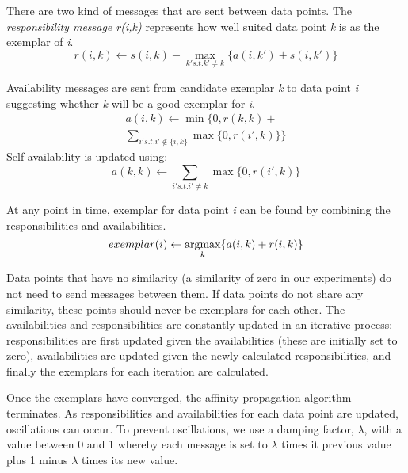 There are two kind of messages that are sent between data points. The \emph{responsibility message r(i,k)} represents how well suited data point \emph{k} is as the exemplar of \emph{i}.
\begin{equation}
	\displaystyle r(i,k)\leftarrow s(i,k)-\max_{k' s.t. k' \neq k}\{a(i,k') + s(i,k')\}
	\label{eq:resp}
\end{equation}

Availability messages are sent from candidate exemplar \emph{k} to data point \emph{i} suggesting whether \emph{k} will be a good exemplar for \emph{i}.
\begin{eqnarray*}
	\displaystyle a(i,k) \leftarrow \min\{0,r(k,k) + \\
    \sum_{i' s.t. i' \notin \{i,k\}}\max\{0, r(i',k)\}\}	
    \label{eq:avail}
\end{eqnarray*}
\begin{equation}
\end{equation}
Self-availability is updated using:
\begin{equation}
	\displaystyle a(k,k) \leftarrow \sum_{i' s.t. i' \neq k} \max\{0, r(i',k)\}
	\label{eq:self}
\end{equation}

At any point in time, exemplar for data point \emph{i} can be found by combining the responsibilities and availabilities.
\begin{equation}
	\displaystyle exemplar(i) \leftarrow \argmax_{k} \{a(i,k) + r(i, k)\}
	\label{eq:exemplar}
\end{equation}

Data points that have no similarity (a similarity of zero in our experiments) do not need to send messages between them. If data points do not share any similarity, these points should never be exemplars for each other. The availabilities and responsibilities are constantly updated in an iterative process: responsibilities are first updated given the availabilities (these are initially set to zero), availabilities are updated given the newly calculated responsibilities, and finally the exemplars for each iteration are calculated. 

Once the exemplars have converged, the affinity propagation algorithm terminates. As responsibilities and availabilities for each data point are updated, oscillations can occur. To prevent oscillations, we use a damping factor, $\lambda$, with a value between 0 and 1 whereby each message is set to $\lambda$ times it previous value plus 1 minus $\lambda$ times its new value. 
